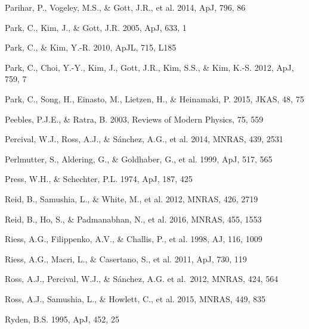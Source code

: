 \documentclass[iop]{emulateapj}
\begin{document}
\begin{thebibliography}{}
Parihar, P., Vogeley, M.S., \& Gott, J.R., et al. 2014, ApJ, 796, 86

Park, C., Kim, J., \& Gott, J.R. 2005, ApJ, 633, 1  

Park, C., \& Kim, Y.-R. 2010, ApJL, 715, L185  

Park, C., Choi, Y.-Y., Kim, J., Gott, J.R., Kim, S.S., \&
Kim, K.-S. 2012, ApJ, 759, 7

Park, C., Song, H., Einasto, M., Lietzen, H., \&
Heinamaki, P. 2015, JKAS, 48, 75

Peebles, P.J.E., \& Ratra, B. 2003, Reviews of Modern Physics, 75, 559

Percival, W.J., Ross, A.J., \& S\'{a}nchez, A.G., et al. 2014, MNRAS, 439, 2531

Perlmutter, S., Aldering, G., \& Goldhaber, G., et al. 1999, ApJ, 517, 565  

Press, W.H., \& Schechter, P.L. 1974, ApJ, 187, 425



Reid, B., Samushia, L., \& White, M., et al. 2012, MNRAS, 426, 2719  

Reid, B., Ho, S., \& Padmanabhan, N., et al.  2016, MNRAS, 455, 1553

Riess, A.G., Filippenko, A.V., \& Challis, P., et al. 1998, AJ, 116, 1009  

Riess, A.G., Macri, L., \& Casertano, S., et al. 2011, ApJ, 730, 119

Ross, A.J., Percival, W.J., \& S{\'a}nchez, A.G. et al.\ 2012, MNRAS, 424, 564 

Ross, A.J., Samushia, L., \& Howlett, C., et al. 2015, MNRAS, 449, 835

Ryden, B.S. 1995, ApJ, 452, 25  



\end{thebibliography}
\end{document}
